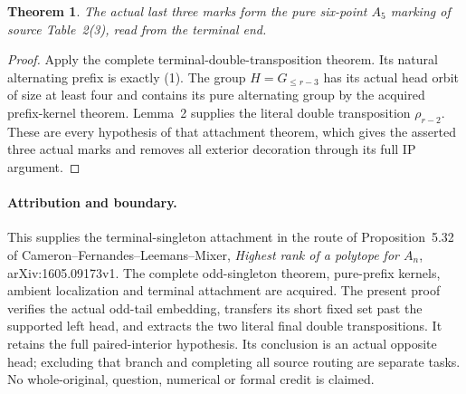\documentclass[11pt,a4paper]{article}
\newtheorem{theorem}[lemma]{Theorem}
\begin{document}
\begin{theorem}
The actual last three marks form the pure six-point
$A_5$ marking of source Table~2(3), read from the terminal end.
\end{theorem}
\begin{proof}
Apply the complete terminal-double-transposition theorem.
Its natural alternating prefix is exactly (1).
The group $H=G_{\le r-3}$ has its actual head orbit of
size at least four and contains its pure alternating group
by the acquired prefix-kernel theorem. Lemma~2 supplies
the literal double transposition $\rho_{r-2}$.
These are every hypothesis of that attachment theorem,
which gives the asserted three actual marks and removes
all exterior decoration through its full IP argument.
\end{proof}

\paragraph{Attribution and boundary.}
This supplies the terminal-singleton attachment in the route of
Proposition~5.32 of Cameron--Fernandes--Leemans--Mixer,
\emph{Highest rank of a polytope for $A_n$}, arXiv:1605.09173v1.
The complete odd-singleton theorem, pure-prefix kernels,
ambient localization and terminal attachment are acquired.
The present proof verifies the actual odd-tail embedding,
transfers its short fixed set past the supported left head,
and extracts the two literal final double transpositions.
It retains the full paired-interior hypothesis. Its conclusion
is an actual opposite head; excluding that branch and completing
all source routing are separate tasks. No whole-original,
question, numerical or formal credit is claimed.
\end{document}
